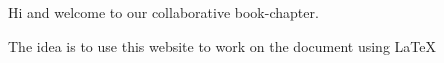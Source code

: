 Hi and welcome to our collaborative book-chapter.  

The idea is to use this website to work on the document using \LaTeX